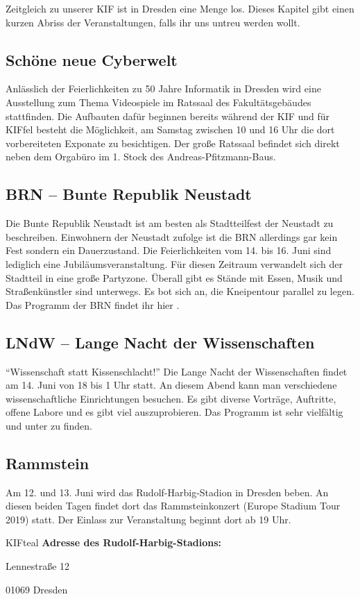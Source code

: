Zeitgleich zu unserer KIF ist in Dresden eine Menge los. Dieses Kapitel gibt einen kurzen Abriss der Veranstaltungen, falls ihr uns untreu werden wollt.

\subsection*{Schöne neue Cyberwelt}
Anlässlich der Feierlichkeiten zu 50 Jahre Informatik in Dresden wird eine Ausstellung zum Thema Videospiele im Ratssaal des Fakultätsgebäudes stattfinden.
Die Aufbauten dafür beginnen bereits während der KIF und für KIFfel besteht die Möglichkeit, am Samstag zwischen 10 und 16 Uhr die dort vorbereiteten Exponate zu besichtigen.
Der große Ratssaal befindet sich direkt neben dem Orgabüro im 1. Stock des Andreas-Pfitzmann-Baus.


\subsection*{BRN -- Bunte Republik Neustadt}
Die Bunte Republik Neustadt ist am besten als Stadtteilfest der Neustadt zu beschreiben.
Einwohnern der Neustadt zufolge ist die BRN allerdings gar kein Fest sondern ein Dauerzustand.
Die Feierlichkeiten vom 14. bis 16. Juni sind lediglich eine Jubiläumsveranstaltung.
Für diesen Zeitraum verwandelt sich der Stadtteil in eine große Partyzone.
Überall gibt es Stände mit Essen, Musik und Straßenkünstler sind unterwegs.
Es bot sich an, die Kneipentour parallel zu legen.
Das Programm der BRN findet ihr hier .

\subsection*{LNdW -- Lange Nacht der Wissenschaften}
\enquote{Wissenschaft statt Kissenschlacht!}
 Die Lange Nacht der Wissenschaften findet am 14. Juni von 18 bis 1 Uhr statt.
An diesem Abend kann man verschiedene wissenschaftliche Einrichtungen besuchen.
Es gibt diverse Vorträge, Auftritte, offene Labore und es gibt viel auszuprobieren.
Das Programm ist sehr vielfältig und unter  zu finden.

\subsection*{Rammstein}
Am 12. und 13. Juni wird das Rudolf-Harbig-Stadion in Dresden beben.
An diesen beiden Tagen findet dort das Rammsteinkonzert (Europe Stadium Tour 2019) statt.
Der Einlass zur Veranstaltung beginnt dort ab 19 Uhr.

\begin{awesomeblock}[KIFteal]{2pt}{\faQuestion}{KIFteal}
    \textbf{Adresse des Rudolf-Harbig-Stadions:}

    Lennestraße 12

    01069 Dresden
\end{awesomeblock}

